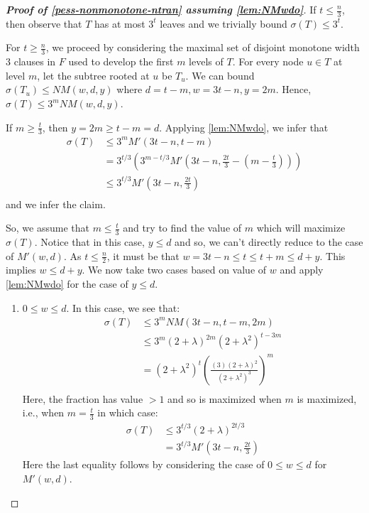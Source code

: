 \documentclass[10pt,a4paper]{article}
\newcommand{\total}{\sigma}
\newcommand{\openinteger}{y}
\begin{document}
\begin{proof}[\textbf{Proof of \cref{pess-nonmonotone-ntran} assuming \cref{lem:NMwdo}}]
If $t \le \frac{n}{3}$, then observe that $T$ has at most $3^t$ leaves and we trivially bound $\total(T)\le 3^t$.

For $t \ge \frac{n}{3}$, we proceed by considering the maximal set of disjoint monotone width $3$ clauses in $F$ used to develop the first $m$ levels of $T$.
For every node $u\in T$ at level $m$, let the subtree rooted at $u$ be $T_u$.
We can bound $\total(T_u) \le NM(w, d, \openinteger)$ where $d = t-m, w = 3t-n, \openinteger = 2m$. Hence, $\total(T) \le 3^m NM(w, d, \openinteger)$.

If $m \ge \frac{t}{3}$, then $\openinteger = 2m \ge t - m = d$. Applying \cref{lem:NMwdo}, we infer that
\begin{align*}
\total(T) & \le 3^m M'(3t-n, t-m)\\
& = 3^{t/3} \left(3^{m-t/3} M'\left(3t-n, \frac{2t}{3} - \left(m - \frac{t}{3}\right) \right)\right)\\
& \le 3^{t/3} M'\left(3t-n, \frac{2t}{3}\right)\\
\end{align*}
and we infer the claim.

So, we assume that $m \le \frac{t}{3}$ and try to find the value of $m$ which will maximize $\total(T)$. Notice that in this case, $\openinteger \le d$ and so, we can't directly reduce to the case of $M'(w, d)$. 
As $t\le \frac{n}{2}$, it must be that $w = 3t-n \le t\le t+m \le d + \openinteger$.
This implies $w\le d+\openinteger$.
We now take two cases based on value of $w$ and apply \cref{lem:NMwdo} for the case of $\openinteger \le d$.

\begin{enumerate}[label=\textbf{Case \arabic*:}, itemindent=*, leftmargin=0em]

\item $0\le w\le d$.
In this case, we see that:
\begin{align*}
\total(T)   
   & \le 3^m NM\left(3t-n, t - m, 2m\right)\\
   & \le 3^m (2+\lambda)^{2m}(2+\lambda^2)^{t-3m}\\
   & = (2+\lambda^2)^t\left(\frac{(3)(2+\lambda)^2}{(2+\lambda^2)^3}\right)^m\\
\end{align*}
Here, the fraction has value $> 1$ and so is maximized when $m$ is maximized, i.e., when $m = \frac{t}{3}$ in which case:
\begin{align*}
\total(T)
& \le 3^{t/3} (2+\lambda)^{2t/3}\\
& = 3^{t/3} M'\left(3t-n, \frac{2t}{3}\right)
\end{align*}
Here the last equality follows by considering the case of $0\le w\le d$ for $M'(w, d)$.


\end{enumerate}
\end{proof}
\end{document}
